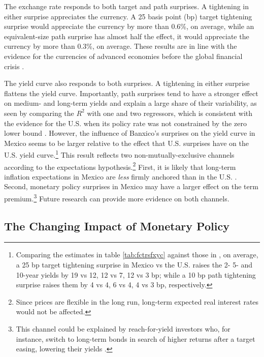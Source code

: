 \documentclass[a4paper, 12pt]{article}
\begin{document}
The exchange rate responds to both target and path surprises. A tightening in either surprise appreciates the currency. A 25 basis point (bp) target tightening surprise would appreciate the currency by more than 0.6\%, on average, while an equivalent-size path surprise has almost half the effect, it would appreciate the currency by more than 0.3\%, on average. 
These results are in line with the evidence for the currencies of advanced economies before the global financial crisis \parencite{Rosa:2011JBF}. 

The yield curve also responds to both surprises. 
A tightening in either surprise flattens the yield curve. 
Importantly, path surprises tend to have a stronger effect on medium- and long-term yields and explain a large share of their variability, as seen by comparing the \(R^2\) with one and two regressors, which is consistent with the evidence for the U.S. when its policy rate was not constrained by the zero lower bound \parencite{GSS:2005a,Swanson:2021}. 
However, the influence of Banxico's surprises on the yield curve in Mexico seems to be larger relative to the effect that U.S. surprises have on the U.S. yield curve.\footnote{Comparing the estimates in table \ref{tab:fctrsfxyc} against those in \textcite{GSS:2005a}, on average, a 25 bp target tightening surprise in Mexico vs the U.S. raises the 2- 5- and 10-year yields by 19 vs 12, 12 vs 7, 12 vs 3 bp; while a 10 bp path tightening surprise raises them by 4 vs 4, 6 vs 4, 4 vs 3 bp, respectively.}
This result reflects two non-mutually-exclusive channels according to the expectations hypothesis.\footnote{Since prices are flexible in the long run, long-term expected real interest rates would not be affected.} 
First, it is likely that long-term inflation expectations in Mexico are \textit{less} firmly anchored than in the U.S. \parencites[][fig. 12]{AndreasenChristensenRiddell:2021}[][fig. 10]{Beauregard_etal:2021}. 
Second, monetary policy surprises in Mexico may have a larger effect on the term premium.\footnote{This channel could be explained by reach-for-yield investors who, for instance, switch to long-term bonds in search of higher returns after a target easing, lowering their yields \parencite{HansonStein:2015}.} 
Future research can provide more evidence on both channels.


\subsection{The Changing Impact of Monetary Policy} \label{sec:sbreaksfxyc}
\end{document}
